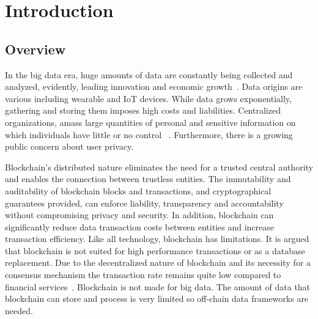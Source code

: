 \chapter{Introduction}
\label{introduction}

\section{Overview}
\label{introduction:overview}

In the big data era, huge amounts of data are constantly being collected and analyzed, evidently, leading innovation and
economic growth~\cite{10.1109/SPW.2015.27}. Data origins are various including wearable and IoT devices.
While data grows exponentially, gathering and storing them imposes high costs and liabilities.
Centralized organizations, amass large quantities of personal and sensitive information on which individuals have little or no control ~\cite{10.1109/SPW.2015.27}.
Furthermore, there is a growing public concern about user privacy.

Blockchain’s distributed nature eliminates the need for a trusted central authority and enables the connection between trustless entities.
The immutability and auditability of blockchain blocks and transactions, and cryptographical guarantees provided, can enforce liability, transparency and accountability without compromising privacy and security.
In addition, blockchain can significantly reduce data transaction costs between entities and increase transaction efficiency.
Like all technology, blockchain has limitations. It is argued that blockchain is not suited for high performance transactions or as a database replacement.
Due to the decentralized nature of blockchain and its necessity for a consensus mechanism the transaction rate remains quite low compared to financial services~\cite{Sompolinsky2015,Zohar:2015:BUH:2817191.2701411}.
Blockchain is not made for big data. The amount of data that blockchain can store and process is very limited so off-chain data frameworks are needed.
